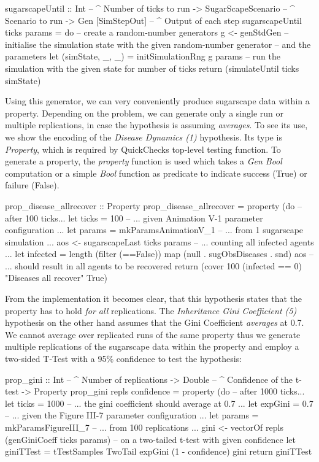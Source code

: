 \begin{HaskellCode}
sugarscapeUntil :: Int                -- ^ Number of ticks to run
                -> SugarScapeScenario -- ^ Scenario to run
                -> Gen [SimStepOut]   -- ^ Output of each step
sugarscapeUntil ticks params = do
  -- create a random-number generators
  g <- genStdGen
  -- initialise the simulation state with the given random-number generator
  -- and the parameters
  let (simState, _, _) = initSimulationRng g params
  -- run the simulation with the given state for number of ticks
  return (simulateUntil ticks simState)
\end{HaskellCode}

Using this generator, we can very conveniently produce sugarscape data within a property. Depending on the problem, we can generate only a single run or multiple replications, in case the hypothesis is assuming \textit{averages}. To see its use, we show the encoding of the \textit{Disease Dynamics (1)} hypothesis. Its type is \textit{Property}, which is required by QuickChecks top-level testing function. To generate a property, the \textit{property} function is used which takes a \textit{Gen Bool} computation or a simple \textit{Bool} function as predicate to indicate success (True) or failure (False).

\begin{HaskellCode}
prop_disease_allrecover :: Property
prop_disease_allrecover = property (do
  -- after 100 ticks...
  let ticks  = 100
  -- ... given Animation V-1 parameter configuration ...
  let params = mkParamsAnimationV_1
  -- ... from 1 sugarscape simulation ...
  aos <- sugarscapeLast ticks params
  -- ... counting all infected agents ...
  let infected = length (filter (==False)) map (null . sugObsDiseases . snd) aos
  -- ... should result in all agents to be recovered
  return (cover 100 (infected == 0) "Diseases all recover" True)
\end{HaskellCode}

From the implementation it becomes clear, that this hypothesis states that the property has to hold \textit{for all} replications. The \textit{Inheritance Gini Coefficient (5)} hypothesis on the other hand assumes that the Gini Coefficient \textit{averages} at 0.7. We cannot average over replicated runs of the same property thus we generate multiple replications of the sugarscape data within the property and employ a two-sided T-Test with a 95\% confidence to test the hypothesis:

\begin{HaskellCode}
prop_gini :: Int      -- ^ Number of replications
          -> Double   -- ^ Confidence of the t-test
          -> Property
prop_gini repls confidence = property (do
  -- after 1000 ticks...
  let ticks = 1000
  -- ... the gini coefficient should average at 0.7 ...
  let expGini = 0.7
  -- ... given the Figure III-7 parameter configuration ...
  let params = mkParamsFigureIII_7
  -- ... from 100 replications ... 
  gini <- vectorOf repls (genGiniCoeff ticks params)
  -- on a two-tailed t-test with given confidence
  let giniTTest = tTestSamples TwoTail expGini (1 - confidence) gini
  return giniTTest
\end{HaskellCode}

